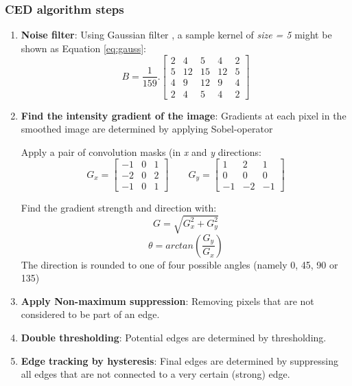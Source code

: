 \subsubsection{CED algorithm steps}
\label{sec:ced_step}
\begin{enumerate}
	\item \textbf{Noise filter}: Using Gaussian filter \nocite{gauss_filter}, a sample kernel of \textit{size = 5} might be shown as Equation \ref{eq:gauss}:
	\begin{equation}
		\label{eq:gauss}
		B = \frac{1}{159} .
		\left[ \begin{array}{ccccc}
		2 & 4 & 5 & 4 & 2 \\
		5 & 12 & 15 & 12 & 5 \\
		4 & 9 & 12 & 9 & 4 \\
		2 & 4 & 5 & 4 & 2
		\end{array} \right]
	\end{equation}

	\item \textbf{Find the intensity gradient of the image}: Gradients at each pixel in the smoothed image are determined by applying Sobel-operator \cite{sobel_alg}

	Apply a pair of convolution masks (in \textit{x} and \textit{y} directions:
	\begin{equation}
		\label{eq:gx_gy}
		G_x =
		\left[ \begin{array}{ccc}
		-1 & 0 & 1 \\
		-2 & 0 & 2 \\
		-1 & 0 & 1
		\end{array} \right]
		\qquad
		G_y =
		\left[ \begin{array}{ccc}
		1 & 2 & 1 \\
		0 & 0 & 0 \\
		-1 & -2 & -1
		\end{array} \right]
	\end{equation}

	Find the gradient strength and direction with:
	\begin{equation}
		\label{eq:gradient}
		G = \sqrt{G^2_x + G^2_y}
	\end{equation}
	\begin{equation}
		\label{eq:direction}
		\theta = arctan(\frac{G_y}{G_x})
	\end{equation}
	The direction is rounded to one of four possible angles (namely 0, 45, 90 or 135)

	\item \textbf{Apply Non-maximum suppression}: Removing pixels that are not considered to be part of an edge.
	\item \textbf{Double thresholding}: Potential edges are determined by thresholding.
	\item \textbf{Edge tracking by hysteresis}: Final edges are determined by suppressing all edges that are not connected to a very certain (strong) edge.
\end{enumerate}

